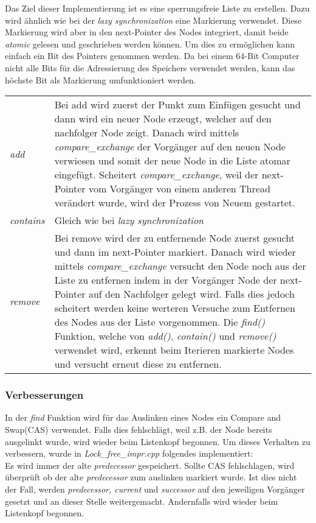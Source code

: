 Das Ziel dieser Implementierung ist es eine sperrungsfreie Liste zu erstellen. Dazu wird ähnlich wie bei der \textit{lazy synchronization} eine Markierung verwendet. 
Diese Markierung wird aber in den next-Pointer des Nodes integriert, damit beide \textit{atomic} gelesen und geschrieben werden können. 
Um dies zu ermöglichen kann einfach ein Bit des Pointers genommen werden. Da bei einem 64-Bit Computer nicht alle Bits für die Adressierung 
des Speichers verwendet werden, kann das höchste Bit als Markierung umfunktioniert werden.

\begin{table}[H]
    \begin{tabularx}{\textwidth}{lX}
		\textit{add} & Bei add wird zuerst der Punkt zum Einfügen gesucht und dann wird ein neuer Node erzeugt, welcher auf den nachfolger Node zeigt. 
		Danach wird mittels \textit{compare\_exchange} der Vorgänger auf den neuen Node verwiesen und somit der neue Node in die Liste atomar eingefügt. 
		Scheitert \textit{compare\_exchange}, weil der next-Pointer vom Vorgänger von einem anderen Thread verändert wurde, wird der Prozess von Neuem gestartet. \\
        \textit{contains} & Gleich wie bei \textit{lazy synchronization} \\
		\textit{remove} & Bei remove wird der zu entfernende Node zuerst gesucht und dann im next-Pointer markiert. 
		Danach wird wieder mittels \textit{compare\_exchange} versucht 
		den Node noch aus der Liste zu entfernen indem in der Vorgänger Node der next-Pointer auf den Nachfolger gelegt wird. Falls dies jedoch scheitert werden 
		keine werteren Versuche zum Entfernen des Nodes aus der Liste vorgenommen. Die \textit{find()} Funktion, welche von \textit{add()}, \textit{contain()} und 
		\textit{remove()} verwendet wird, erkennt beim Iterieren markierte Nodes und versucht erneut diese zu entfernen. \\
    \end{tabularx}
\end{table}

\subsubsection{Verbesserungen}
\label{subsec:impr}
In der \textit{find} Funktion wird für das Auslinken eines Nodes ein Compare and Swap(CAS) verwendet. Falls dies fehlschlägt, 
weil z.B. der Node bereits ausgelinkt wurde,
wird wieder beim Listenkopf begonnen. Um dieses Verhalten zu verbessern, wurde in \textit{Lock\_free\_impr.cpp} folgendes implementiert:\\
Es wird immer der alte \textit{predecessor} gespeichert. Sollte CAS fehlschlagen, wird überprüft ob der alte \textit{predecessor}
zum auslinken markiert wurde. Ist dies nicht der Fall, werden \textit{predecessor, current} und \textit{successor} auf den jeweiligen Vorgänger
gesetzt und an dieser Stelle weitergemacht. Andernfalls wird wieder beim Listenkopf begonnen. 